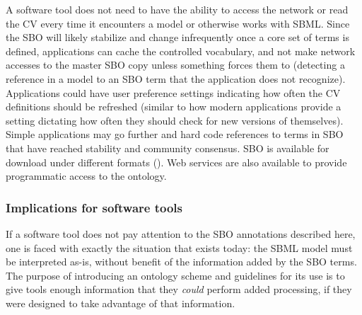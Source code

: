 A software tool does not need to have the ability to access the
network or read the CV every time it encounters a model or
otherwise works with SBML.  Since the SBO will likely stabilize
and change infrequently once a core set of terms is defined,
applications can cache the controlled vocabulary, and not make
network accesses to the master SBO copy unless something forces
them to (\eg detecting a reference in a model to an SBO term that
the application does not recognize).  Applications could have user
preference settings indicating how often the CV definitions should
be refreshed (similar to how modern applications provide a setting
dictating how often they should check for new versions of
themselves).  Simple applications may go further and hard code
references to terms in SBO that have reached stability and
community consensus. SBO is available for download under different
formats (\sboref).  Web services are also available to provide
programmatic access to the ontology.


\subsubsection{Implications for software tools}

If a software tool does not pay attention to the SBO
annotations described here, one is faced with exactly the
situation that exists today: the SBML model must be interpreted
as-is, without benefit of the information added by the SBO terms.
The purpose of introducing an ontology scheme and guidelines for
its use is to give tools enough information that they \emph{could}
perform added processing, if they were designed to take advantage
of that information.
